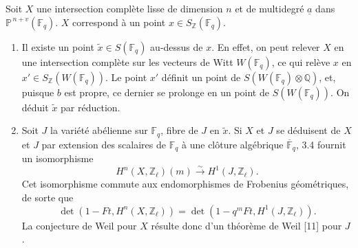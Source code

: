 \documentclass[10pt]{article}
\newcommand{\F}{\mathbb F}
\newcommand{\Pj}{\mathbb P}
\newcommand{\Q}{\mathbb Q}
\newcommand{\Z}{\mathbb Z}
\newcommand{\iso}{\xrightarrow{\sim}}
\begin{document}
Soit \(X\) une intersection complète lisse de dimension \(n\) et de multidegré \(\underline a\) dans \(\Pj^{\,n+v}(\F_q)\). \(X\) correspond à un point \(x\in S_\Z(\F_q)\).
\begin{enumerate}[label=\alph*)]
\item Il existe un point \(\tilde x\in S(\F_q)\) au-dessus de \(x\). En effet, on peut relever \(X\) en une intersection complète sur les vecteurs de Witt \(W(\F_q)\), ce qui relève \(x\) en \(x'\in S_\Z(W(\F_q))\). Le point \(x'\) définit un point de \(S(W(\F_q)\otimes\Q)\), et, puisque \(b\) est propre, ce dernier se prolonge en un point de \(S(W(\F_q))\). On déduit \(\tilde x\) par réduction.
\item Soit \(J\) la variété abélienne sur \(\F_q\), fibre de \(J\) en \(\tilde x\). Si \(X\) et \(J\) se déduisent de \(X\) et \(J\) par extension des scalaires de \(\F_q\) à une clôture algébrique \(\overline{\F}_q\), 3.4 fournit un isomorphisme
\[
H^n(X,\Z_\ell)(m)\iso H^1(J,\Z_\ell).
\]
Cet isomorphisme commute aux endomorphismes de Frobenius géométriques, de sorte que
\[
\tag{3.5.1}
\det(1-Ft,H^n(X,\Z_\ell))=
\det(1-q^mFt,H^1(J,\Z_\ell)).
\]
La conjecture de Weil pour \(X\) résulte donc d'un théorème de Weil [11] pour \(J\).
\end{enumerate}
\end{document}
